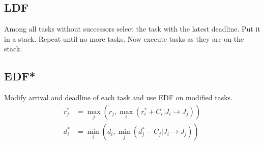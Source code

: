 \subsection{LDF}
Among all tasks without successors select the task with the latest deadline. Put
it in a stack. Repeat until no more tasks. Now execute tasks as they are on the
stack.

\subsection{EDF*}
Modify arrival and deadline of each task and use EDF on modified tasks.
\begin{align*}
	r_j^* &= \max_{j}\left(r_j, \max_{i}\left(r_i^* + C_i | J_i \to J_j\right)\right) \\
	d_i^* &= \min_{i}\left(d_i, \min_{j}\left(d_j^* - C_j | J_i \to J_j\right)\right)
\end{align*}
